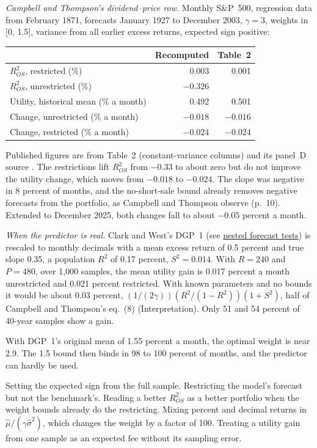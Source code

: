 \begin{qfmethod}
\emph{Campbell and Thompson's dividend--price row.} Monthly S\&P~500, regression data from February 1871, forecasts January 1927 to December 2003, $\gamma=3$, weights in [0, 1.5], variance from all earlier excess returns, expected sign positive:
\begin{center}\small
\begin{tabular}{@{}lrr@{}}
\toprule
& Recomputed & Table~2 \\
\midrule
$R^2_{OS}$, restricted (\%) & 0.003 & 0.001 \\
$R^2_{OS}$, unrestricted (\%) & $-0.326$ & \\
Utility, historical mean (\% a month) & 0.492 & 0.501 \\
Change, unrestricted (\% a month) & $-0.018$ & $-0.016$ \\
Change, restricted (\% a month) & $-0.024$ & $-0.024$ \\
\bottomrule
\end{tabular}
\end{center}
Published figures are from Table~2 (constant-variance columns) and its panel~D source \citep[Table~2, unnumbered table page]{campbell-thompson-2005-nber}. The restrictions lift $R^2_{OS}$ from $-0.33$ to about zero but do not improve the utility change, which moves from $-0.018$ to $-0.024$. The slope was negative in 8 percent of months, and the no-short-sale bound already removes negative forecasts from the portfolio, as Campbell and Thompson observe (p.~10). Extended to December 2025, both changes fall to about $-0.05$ percent a month.

\emph{When the predictor is real.} Clark and West's DGP~1 (see \hyperref[meth:nested-forecast-tests]{nested forecast tests}) is rescaled to monthly decimals with a mean excess return of 0.5 percent and true slope 0.35, a population $R^2$ of 0.17 percent, $S^2=0.014$. With $R=240$ and $P=480$, over 1,000 samples, the mean utility gain is 0.017 percent a month unrestricted and 0.021 percent restricted. With known parameters and no bounds it would be about 0.03 percent, $(1/(2\gamma))(R^2/(1-R^2))(1+S^2)$, half of Campbell and Thompson's eq.~(8) (Interpretation). Only 51 and 54 percent of 40-year samples show a gain.

With DGP~1's original mean of 1.55 percent a month, the optimal weight is near 2.9. The 1.5 bound then binds in 98 to 100 percent of months, and the predictor can hardly be used.

 Setting the expected sign from the full sample. Restricting the model's forecast but not the benchmark's. Reading a better $R^2_{OS}$ as a better portfolio when the weight bounds already do the restricting. Mixing percent and decimal returns in $\hat\mu/(\gamma\hat\sigma^2)$, which changes the weight by a factor of 100. Treating a utility gain from one sample as an expected fee without its sampling error.


\end{qfmethod}
